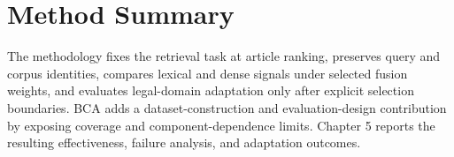 \section{Method Summary}

The methodology fixes the retrieval task at article ranking, preserves query and corpus identities, compares lexical and dense signals under selected fusion weights, and evaluates legal-domain adaptation only after explicit selection boundaries. BCA adds a dataset-construction and evaluation-design contribution by exposing coverage and component-dependence limits. Chapter 5 reports the resulting effectiveness, failure analysis, and adaptation outcomes.
